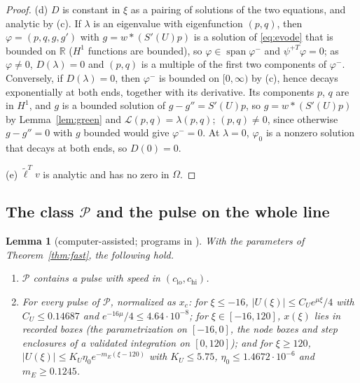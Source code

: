 \documentclass[11pt]{article}
\newtheorem{lemma}{Lemma}[section]
\theoremstyle{definition}
\newcommand{\R}{\mathbb{R}}
\newcommand{\Lop}{\mathcal{L}}
\newcommand{\Pcl}{\mathcal{P}}
\begin{document}
\begin{proof}
(d) $D$ is constant in $\xi$ as a pairing of solutions of the two equations, and analytic by (c). If $\lambda$ is an eigenvalue with eigenfunction $(p, q)$, then $\varphi = (p, q, g, g')$ with $g = w * (S'(U)p)$ is a solution of \eqref{eq:evode} that is bounded on $\R$ ($H^1$ functions are bounded), so $\varphi \in \operatorname{span}\varphi^-$ and $\psi^{+T}\varphi = 0$; as $\varphi \ne 0$, $D(\lambda) = 0$ and $(p, q)$ is a multiple of the first two components of $\varphi^-$. Conversely, if $D(\lambda) = 0$, then $\varphi^-$ is bounded on $[0, \infty)$ by (c), hence decays exponentially at both ends, together with its derivative. Its components $p$, $q$ are in $H^1$, and $g$ is a bounded solution of $g - g'' = S'(U)p$, so $g = w * (S'(U)p)$ by Lemma~\ref{lem:green} and $\Lop(p, q) = \lambda(p, q)$; $(p, q) \ne 0$, since otherwise $g - g'' = 0$ with $g$ bounded would give $\varphi^- = 0$. At $\lambda = 0$, $\varphi_0$ is a nonzero solution that decays at both ends, so $D(0) = 0$.

(e) $\tilde\ell^Tv$ is analytic and has no zero in $\Omega$.
\end{proof}

\subsection{The class \texorpdfstring{$\Pcl$}{P} and the pulse on the whole line}

\begin{lemma}[computer-assisted; programs in ]\label{lem:class}
With the parameters of Theorem~\ref{thm:fast}, the following hold.
\begin{enumerate}
\item[(a)] $\Pcl$ contains a pulse with speed in $(c_{\mathrm{lo}}, c_{\mathrm{hi}})$.
\item[(b)] For every pulse of $\Pcl$, normalized as $x_c$: for $\xi \le -16$, $|U(\xi)| \le C_U e^{\mu\xi}/4$ with $C_U \le 0.14687$ and $e^{-16\mu}/4 \le 4.64\cdot 10^{-8}$; for $\xi \in [-16, 120]$, $x(\xi)$ lies in recorded boxes (the parametrization on $[-16, 0]$, the node boxes and step enclosures of a validated integration on $[0, 120]$); and for $\xi \ge 120$, $|U(\xi)| \le K_U\eta_0e^{-m_E(\xi - 120)}$ with $K_U \le 5.75$, $\eta_0 \le 1.4672\cdot 10^{-6}$ and $m_E \ge 0.1245$.
\end{enumerate}
\end{lemma}
\end{document}
